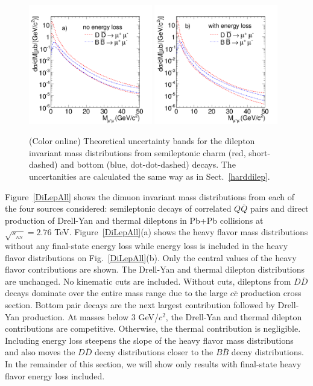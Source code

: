 \begin{figure}
\includegraphics[width=0.48\textwidth]{chap_DiMuonContinuum_figures/Fig5a_histNoEloss}
\includegraphics[width=0.48\textwidth]{chap_DiMuonContinuum_figures/Fig5b_histEloss}
\caption{(Color online) Theoretical uncertainty bands for the dilepton 
invariant mass distributions from semileptonic charm (red, short-dashed) 
and bottom (blue, dot-dot-dashed) decays. The uncertanities are calculated 
the same way as in Sect.~\protect\ref{harddilep}.}
\label{ScaleAndMassVariation}
\end{figure}

Figure~\ref{DiLepAll} shows the dimuon invariant mass distributions from each
of the four sources considered: semileptonic decays of correlated $Q \overline
Q$ pairs and direct production of Drell-Yan and thermal dileptons in
Pb+Pb collisions at $\sqrt {s_{_{NN}}}=2.76$ TeV. Figure~\ref{DiLepAll}(a) shows 
the heavy flavor mass distributions without any
final-state energy loss while energy loss is included in the heavy flavor
distributions on Fig.~\ref{DiLepAll}(b).  Only the central values of the heavy
flavor contributions are shown.
The Drell-Yan and thermal dilepton
distributions are unchanged.  No kinematic cuts are included.  Without cuts, 
dileptons from $D \overline{D}$ decays dominate over the entire
mass range due to the large $c \overline{c}$ production cross section. 
Bottom pair decays are the next largest contribution followed by Drell-Yan
production.  At masses below 3 GeV/$c^2$, the Drell-Yan and thermal dilepton
contributions are competitive.  Otherwise, the thermal contribution is 
negligible. Including energy loss steepens the slope of the heavy flavor mass
distributions and also moves the $D \overline D$ decay distributions closer to
the $B \overline B$ decay distributions.  In the remainder of this section, we
will show only results with final-state heavy flavor energy loss included.

